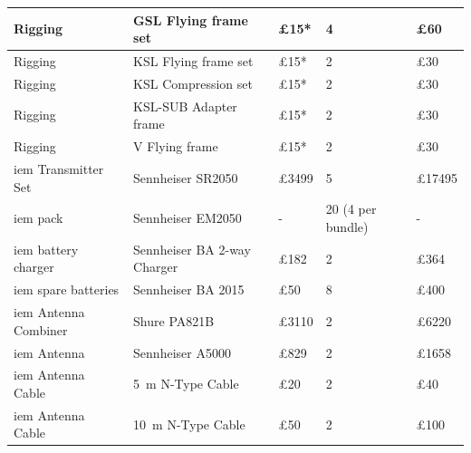 \begin{longtable}[H]{|p{3cm}|p{4cm}|p{2cm}|p{3cm}|p{2cm}|}
Rigging                            & GSL Flying frame set               & £15*                          & 4                                  & £60    \\ \hline
Rigging                            & KSL Flying frame set               & £15*                          & 2                                  & £30    \\ \hline
Rigging                            & KSL Compression set                & £15*                          & 2                                  & £30    \\ \hline
Rigging                            & KSL-SUB Adapter frame              & £15*                          & 2                                  & £30    \\ \hline
Rigging                            & V Flying frame                     & £15*                          & 2                                  & £30    \\ \hline
\rowcolor[HTML]{EFEFEF} 
\gls{iem} Transmitter Set     & Sennheiser SR2050                  & £3499                         & 5                                  & £17495 \\ \hline
\rowcolor[HTML]{EFEFEF} 
\gls{iem} pack                & Sennheiser EM2050                  & -                             & 20 (4 per bundle)                  & -      \\ \hline
\rowcolor[HTML]{EFEFEF} 
\gls{iem} battery charger     & Sennheiser BA 2-way Charger        & £182                          & 2                                  & £364   \\ \hline
\rowcolor[HTML]{EFEFEF} 
\gls{iem} spare batteries     & Sennheiser BA 2015                 & £50                           & 8                                  & £400   \\ \hline
\rowcolor[HTML]{EFEFEF} 
\gls{iem} Antenna Combiner    & Shure PA821B                       & £3110                         & 2                                  & £6220  \\ \hline
\rowcolor[HTML]{EFEFEF} 
\gls{iem} Antenna             & Sennheiser A5000                   & £829                          & 2                                  & £1658  \\ \hline
\rowcolor[HTML]{EFEFEF} 
\gls{iem} Antenna Cable       & \SI{5}{\metre} N-Type Cable        & £20                           & 2                                  & £40    \\ \hline
\rowcolor[HTML]{EFEFEF} 
\gls{iem} Antenna Cable       & \SI{10}{\metre} N-Type Cable       & £50                           & 2                                  & £100   \\ \hline

\end{longtable}
